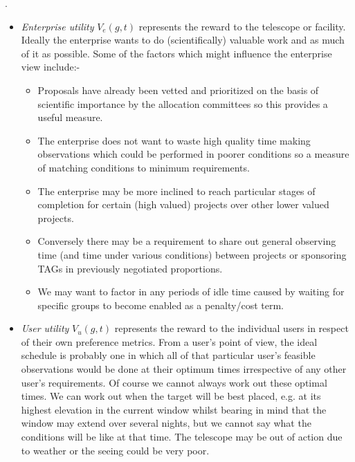 . %
\begin{itemize}
\item \emph{Enterprise utility} $V_e(g,t)$  represents the reward to the telescope or facility. Ideally the enterprise wants to do (scientifically) valuable work and as much of it as possible. Some of the factors which might influence the enterprise view include:-
\begin{itemize}
\item Proposals have already been vetted and prioritized on the basis of scientific importance by the allocation committees so this provides a useful measure.
\item The enterprise does not want to waste high quality time making observations which could be performed in poorer conditions so a measure of matching conditions to minimum requirements.
\item The enterprise may be more inclined to reach particular stages of completion for certain (high valued) projects over other lower valued projects.
\item Conversely there may be a requirement to share out general observing time (and time under various conditions) between projects or sponsoring TAGs in previously negotiated proportions.
\item We may want to factor in any periods of idle time caused by waiting for specific groups to become enabled as a penalty/cost term.
\end{itemize}

\item \emph{User utility}  $V_u(g,t)$  represents the reward to the individual users in respect of their own preference metrics. From a user's point of view, the ideal schedule is probably one in which all of that particular user's feasible observations would be done at their optimum times irrespective of any other user's requirements. Of course we cannot always work out these optimal times. We can work out when the target will be best placed, e.g. at its highest elevation in the current window whilst bearing in mind that the window may extend over several nights, but we cannot say what the conditions will be like at that time. The telescope may be out of action due to weather or the seeing could be very poor. 


\end{itemize}
